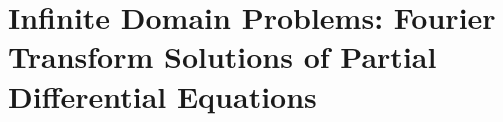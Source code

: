 \chapter{Infinite Domain Problems: Fourier Transform Solutions of Partial Differential Equations}
\label{ch:fourier-transforms}








